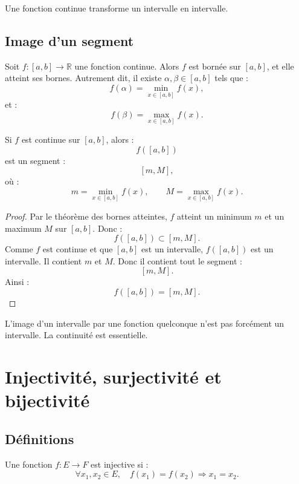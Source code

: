 \documentclass[11pt,a4paper]{article}
\newcommand{\R}{\mathbb R}
\newcommand{\implique}{\Longrightarrow}
\begin{document}
\begin{retenirbox}
Une fonction continue transforme un intervalle en intervalle.
\end{retenirbox}

\subsection{Image d'un segment}

\begin{theorembox}
Soit \(f:[a,b]\to\R\) une fonction continue.  
Alors \(f\) est bornée sur \([a,b]\), et elle atteint ses bornes.  
Autrement dit, il existe \(\alpha,\beta\in[a,b]\) tels que :
\[
f(\alpha)=\min_{x\in[a,b]}f(x),
\]
et :
\[
f(\beta)=\max_{x\in[a,b]}f(x).
\]
\end{theorembox}

\begin{theorembox}
Si \(f\) est continue sur \([a,b]\), alors :
\[
f([a,b])
\]
est un segment :
\[
[m,M],
\]
où :
\[
m=\min_{x\in[a,b]}f(x),
\qquad
M=\max_{x\in[a,b]}f(x).
\]
\end{theorembox}

\begin{proof}
Par le théorème des bornes atteintes, \(f\) atteint un minimum \(m\) et un maximum \(M\) sur \([a,b]\).  
Donc :
\[
f([a,b])\subset[m,M].
\]
Comme \(f\) est continue et que \([a,b]\) est un intervalle, \(f([a,b])\) est un intervalle.  
Il contient \(m\) et \(M\).  
Donc il contient tout le segment :
\[
[m,M].
\]
Ainsi :
\[
f([a,b])=[m,M].
\]
\end{proof}

\begin{erreurbox}
L'image d'un intervalle par une fonction quelconque n'est pas forcément un intervalle.  
La continuité est essentielle.
\end{erreurbox}

\section{Injectivité, surjectivité et bijectivité}

\subsection{Définitions}

\begin{definitionbox}[Injectivité]
Une fonction \(f:E\to F\) est injective si :
\[
\forall x_1,x_2\in E,\quad f(x_1)=f(x_2)\implique x_1=x_2.
\]
\end{definitionbox}
\end{document}
